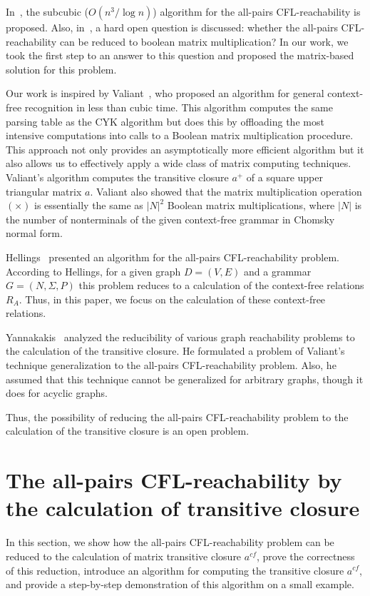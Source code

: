 \documentclass[runningheads,a4paper]{llncs}
\begin{document}
In~\cite{chaudhuri2008subcubic}, the subcubic ($O(n^3/\log{}n)$) algorithm for the all-pairs CFL-reachability is proposed. Also, in~\cite{chaudhuri2008subcubic}, a hard open question is discussed: whether the all-pairs CFL-reachability can be
reduced to boolean matrix multiplication? In our work, we took the first step to an answer to this question and proposed the matrix-based solution for this problem.

Our work is inspired by Valiant~\cite{valiant}, who proposed an algorithm for general context-free recognition in less than cubic time. This algorithm computes the same parsing table as the CYK algorithm but does this by offloading the most intensive computations into calls to a Boolean matrix multiplication procedure. This approach not only provides an asymptotically more efficient algorithm but it also allows us to effectively apply a wide class of matrix computing techniques. Valiant's algorithm computes the transitive closure $a^+$ of a square upper triangular matrix $a$. Valiant also showed that the matrix multiplication operation $(\times)$ is essentially the same as $|N|^2$ Boolean matrix multiplications, where $|N|$ is the number of nonterminals of the given context-free grammar in Chomsky normal form.

Hellings~\cite{hellingsRelational} presented an algorithm for the all-pairs CFL-reachability problem. According to Hellings, for a given graph $D = (V, E)$ and a grammar $G = (N, \Sigma, P)$ this problem reduces to a calculation of the context-free relations $R_A$. Thus, in this paper, we focus on the calculation of these context-free relations.

Yannakakis~\cite{transitive-closure} analyzed the reducibility of various graph reachability problems to the calculation of the transitive closure. He formulated a problem of Valiant's technique generalization to the all-pairs CFL-reachability problem. Also, he assumed that this technique cannot be generalized for arbitrary graphs, though it does for acyclic graphs.

Thus, the possibility of reducing the all-pairs CFL-reachability problem to the calculation of the transitive closure is an open problem.

\section{The all-pairs CFL-reachability by the calculation of transitive closure}%
In this section, we show how the all-pairs CFL-reachability problem can be reduced to the calculation of matrix transitive closure $a^{cf}$, prove the correctness of this reduction, introduce an algorithm for computing the transitive closure $a^{cf}$, and provide a step-by-step demonstration of this algorithm on a small example.
\end{document}
